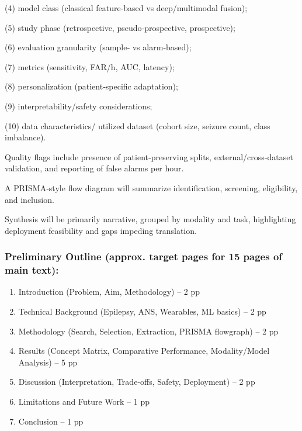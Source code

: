(4) model class (classical feature‑based vs deep/multimodal fusion);

(5) study phase (retrospective, pseudo‑prospective, prospective);

(6) evaluation granularity (sample‑ vs alarm‑based);

(7) metrics (sensitivity, FAR/h, AUC, latency);

(8) personalization (patient‑specific adaptation);

(9) interpretability/safety considerations;

(10) data characteristics/ utilized dataset (cohort size, seizure count, class imbalance).

Quality flags include presence of patient‑preserving splits, external/cross‑dataset
validation, and reporting of false alarms per hour.

A PRISMA‑style flow diagram will summarize identification, screening, eligibility, and
inclusion.

Synthesis will be primarily narrative, grouped by modality and task, highlighting deployment
feasibility and gaps impeding translation.

\subsubsection{Preliminary Outline (approx. target pages for 15 pages of main text):}

\begin{enumerate}
    \item Introduction (Problem, Aim, Methodology) -- 2 pp

    \item Technical Background (Epilepsy, ANS, Wearables, ML basics) -- 2 pp

    \item Methodology (Search, Selection, Extraction, PRISMA flowgraph) -- 2 pp

    \item Results (Concept Matrix, Comparative Performance, Modality/Model
    Analysis) -- 5 pp

    \item Discussion (Interpretation, Trade‑offs, Safety, Deployment) -- 2 pp

    \item Limitations and Future Work -- 1 pp

    \item Conclusion -- 1 pp
\end{enumerate}

